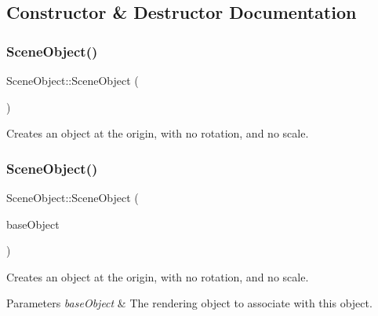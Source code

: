 \subsection{Constructor \& Destructor Documentation}
\hypertarget{class_scene_object_a0d268d96d77dbeb45b07a6442e2f4d0d}{}\label{class_scene_object_a0d268d96d77dbeb45b07a6442e2f4d0d}
\subsubsection{\texorpdfstring{Scene\+Object()}{SceneObject()}\hspace{0.1cm}{\footnotesize\ttfamily [1/3]}}
{\footnotesize\ttfamily Scene\+Object\+::\+Scene\+Object (\begin{DoxyParamCaption}{ }\end{DoxyParamCaption})}



Creates an object at the origin, with no rotation, and no scale.

\hypertarget{class_scene_object_a9dd76f946c8e0743bed57f9499773fbd}{}\label{class_scene_object_a9dd76f946c8e0743bed57f9499773fbd}
\subsubsection{\texorpdfstring{Scene\+Object()}{SceneObject()}\hspace{0.1cm}{\footnotesize\ttfamily [2/3]}}
{\footnotesize\ttfamily Scene\+Object\+::\+Scene\+Object (\begin{DoxyParamCaption}\item[{std\+::shared\+\_\+ptr$<$ class \hyperlink{class_rendering_object}{Rendering\+Object} $>$}]{base\+Object }\end{DoxyParamCaption})}



Creates an object at the origin, with no rotation, and no scale.


\begin{DoxyParams}{Parameters}
{\em base\+Object} & The rendering object to associate with this object. \\
\hline
\end{DoxyParams}
\hypertarget{class_scene_object_aa89b21b4732296d196a76d1785aee02c}{}\label{class_scene_object_aa89b21b4732296d196a76d1785aee02c}
